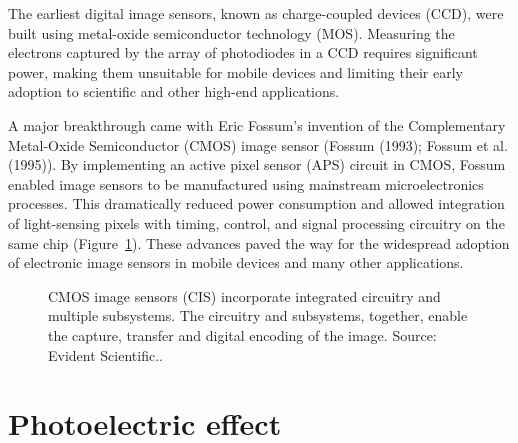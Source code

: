 \documentclass[
  letterpaper,
]{book}
\begin{document}
The earliest digital image sensors, known as charge-coupled devices
(CCD), were built using metal-oxide semiconductor technology (MOS).
Measuring the electrons captured by the array of photodiodes in a CCD
requires significant power, making them unsuitable for mobile devices
and limiting their early adoption to scientific and other high-end
applications.

A major breakthrough came with Eric Fossum's invention of the
Complementary Metal-Oxide Semiconductor (CMOS) image sensor (Fossum
(1993); Fossum et al. (1995)). By implementing an active pixel sensor
(APS) circuit in CMOS, Fossum enabled image sensors to be manufactured
using mainstream microelectronics processes. This dramatically reduced
power consumption and allowed integration of light-sensing pixels with
timing, control, and signal processing circuitry on the same chip
(Figure~\ref{fig-olympus-overview}). These advances paved the way for
the widespread adoption of electronic image sensors in mobile devices
and many other applications.

\begin{figure}


\caption{\label{fig-olympus-overview}CMOS image sensors (CIS)
incorporate integrated circuitry and multiple subsystems. The circuitry
and subsystems, together, enable the capture, transfer and digital
encoding of the image. Source: Evident Scientific..}

\end{figure}%

\section{Photoelectric effect}\label{photoelectric-effect}
\end{document}
